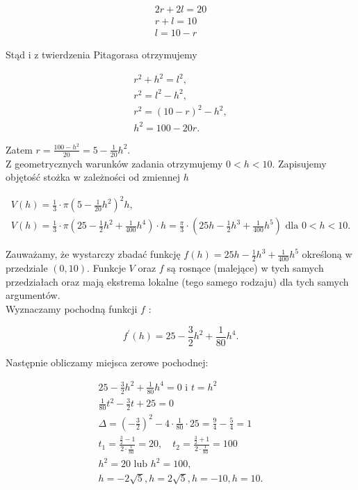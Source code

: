 \documentclass[10pt]{article}
\begin{document}
$$
\begin{gathered}
2 r+2 l=20 \\
r+l=10 \\
l=10-r
\end{gathered}
$$

Stąd i z twierdzenia Pitagorasa otrzymujemy

$$
\begin{gathered}
r^{2}+h^{2}=l^{2}, \\
r^{2}=l^{2}-h^{2}, \\
r^{2}=(10-r)^{2}-h^{2}, \\
h^{2}=100-20 r .
\end{gathered}
$$

Zatem $r=\frac{100-h^{2}}{20}=5-\frac{1}{20} h^{2}$.\\
Z geometrycznych warunków zadania otrzymujemy $0<h<10$. Zapisujemy objętość stożka w zależności od zmiennej $h$

$$
\begin{gathered}
V(h)=\frac{1}{3} \cdot \pi\left(5-\frac{1}{20} h^{2}\right)^{2} h, \\
V(h)=\frac{1}{3} \cdot \pi\left(25-\frac{1}{2} h^{2}+\frac{1}{400} h^{4}\right) \cdot h=\frac{\pi}{3} \cdot\left(25 h-\frac{1}{2} h^{3}+\frac{1}{400} h^{5}\right) \text { dla } 0<h<10 .
\end{gathered}
$$

Zauważamy, że wystarczy zbadać funkcję $f(h)=25 h-\frac{1}{2} h^{3}+\frac{1}{400} h^{5}$ określoną w przedziale $(0,10)$. Funkcje $V$ oraz $f$ są rosnące (malejące) w tych samych przedziałach oraz mają ekstrema lokalne (tego samego rodzaju) dla tych samych argumentów.\\
Wyznaczamy pochodną funkcji $f$ :

$$
f^{\prime}(h)=25-\frac{3}{2} h^{2}+\frac{1}{80} h^{4} .
$$

Następnie obliczamy miejsca zerowe pochodnej:

$$
\begin{gathered}
25-\frac{3}{2} h^{2}+\frac{1}{80} h^{4}=0 \text { i } t=h^{2} \\
\frac{1}{80} t^{2}-\frac{3}{2} t+25=0 \\
\Delta=\left(-\frac{3}{2}\right)^{2}-4 \cdot \frac{1}{80} \cdot 25=\frac{9}{4}-\frac{5}{4}=1 \\
t_{1}=\frac{\frac{3}{2}-1}{2 \cdot \frac{1}{80}}=20, \quad t_{2}=\frac{\frac{3}{2}+1}{2 \cdot \frac{1}{80}}=100 \\
h^{2}=20 \text { lub } h^{2}=100, \\
h=-2 \sqrt{5}, h=2 \sqrt{5}, h=-10, h=10 .
\end{gathered}
$$
\end{document}
